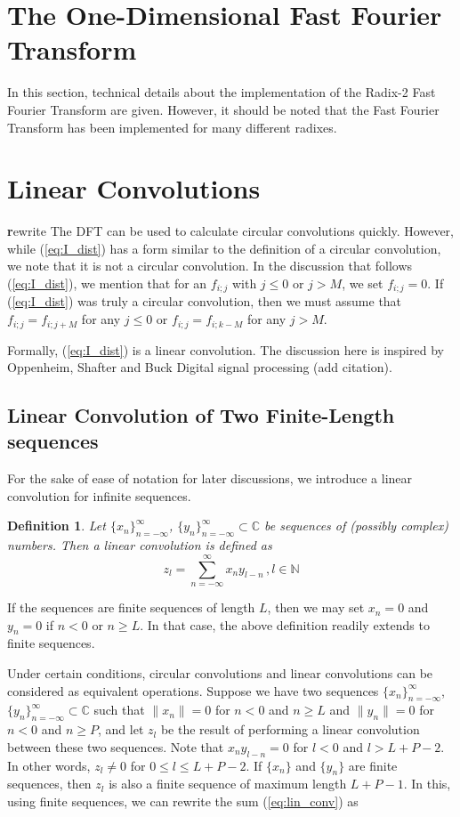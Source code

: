 \documentclass[12pt]{CSUNthesis}
\newtheorem{definition}{Definition}
\begin{document}
\section{The One-Dimensional Fast Fourier Transform}
In this section, technical details about the implementation of the Radix-2 Fast Fourier Transform are given. However, it should be noted that the Fast Fourier Transform has been implemented for many different radixes. 

\section{Linear Convolutions}
{\textbf rewrite} The DFT can be used to calculate circular convolutions quickly. However, while (\ref{eq:I_dist}) has a form similar to the definition of a circular convolution, we note that it is not a circular convolution. In the discussion that follows (\ref{eq:I_dist}), we mention that for an $f_{i;j}$ with $j \leq 0$ or $j > M$, we set $f_{i;j}=0$. If (\ref{eq:I_dist}) was truly a circular convolution, then we must assume that $f_{i;j}=f_{i;j+M}$ for any $j \leq 0$ or $f_{i;j}=f_{i;k-M}$ for any $j > M$. 

Formally, (\ref{eq:I_dist}) is a linear convolution. The discussion here is inspired by Oppenheim, Shafter and Buck Digital signal processing (add citation).

\subsection{Linear Convolution of Two Finite-Length sequences}
\label{sec:lin_conv_fin_seq}
For the sake of ease of notation for later discussions, we introduce a linear convolution for infinite sequences. 
\begin{definition}
Let $\{x_n\}_{n=-\infty}^{\infty}$, $\{y_n\}_{n=-\infty}^{\infty} \subset \mathbb{C}$ be sequences of (possibly complex) numbers. Then a linear convolution is defined as 
\begin{equation}
\label{eq:lin_conv}
z_{l}=\sum_{n=-\infty}^{\infty} x_{n}y_{l-n}\, , l \in \mathbb{N}
\end{equation}
\end{definition}


If the sequences are finite sequences of length $L$, then we may set $x_n=0$ and $y_n=0$ if $n<0$ or $n \geq L$. In that case, the above definition readily extends to finite sequences.

Under certain conditions, circular convolutions and linear convolutions can be considered as equivalent operations. Suppose we have two sequences $\{x_n\}_{n=-\infty}^{\infty}$,$\{y_n\}_{n=-\infty}^{\infty} \subset \mathbb{C}$ 
such that $\lVert x_n \lVert = 0$ for $n<0$ and $n\geq L$ and $\lVert y_n \lVert = 0$ for $n<0$ and $n \geq P$, and let $z_l$ be the result of performing a linear convolution between these two sequences. Note that $x_n y_{l-n}=0$ for $l < 0$ and $l > L + P - 2$. In other words, $z_l \not = 0$ for $0 \leq l \leq L + P - 2$. If $\{x_n\}$ and $\{y_n\}$ are finite sequences, then $z_l$ is also a finite sequence of maximum length $L+P-1$. In this, using finite sequences, we can rewrite the sum (\ref{eq:lin_conv}) as 
\end{document}

